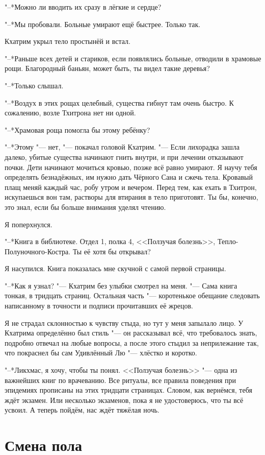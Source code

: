 \documentclass[a4paper,10pt]{book}
\begin{document}
"--*Можно ли вводить их сразу в лёгкие и сердце?

"--*Мы пробовали. Больные умирают ещё быстрее. Только так.

Кхатрим укрыл тело простынёй и встал.

"--*Раньше всех детей и стариков, если появлялись больные, отводили в храмовые 
рощи. Благородный баньян, может быть, ты видел такие деревья?

"--*Только слышал.

"--*Воздух в этих рощах целебный, существа гибнут там очень быстро. К 
сожалению, 
возле Тхитрона нет ни одной. 

"--*Храмовая роща помогла бы этому ребёнку?

"--*Этому "--- нет, "--- покачал головой Кхатрим. "--- Если лихорадка зашла 
далеко, убитые существа начинают гнить внутри, и при лечении отказывают почки.
Дети начинают мочиться кровью, позже всё равно умирают. 
Я научу тебя определять безнадёжных, им нужно дать Чёрного Сана и сжечь тела. 
Кровавый плащ меняй каждый час, робу утром и вечером. Перед тем, как ехать в 
Тхитрон, искупаешься вон там, растворы для втирания в тело приготовят. Ты бы, 
конечно, это 
знал, если бы больше внимания уделял чтению.

Я поперхнулся.

"--*Книга в библиотеке. Отдел 1, полка 4, <<Ползучая болезнь>>, 
Тепло-Полуночного-Костра. Ты её хотя бы открывал?

Я насупился. Книга показалась мне скучной с самой первой страницы.

"--*Как я узнал? "--- Кхатрим без улыбки смотрел на меня. "--- Сама книга 
тонкая,
в тридцать страниц. Остальная часть "--- коротенькое обещание следовать 
написанному
в точности и подписи прочитавших её жрецов.

Я не страдал склонностью к чувству стыда, но тут у меня запылало лицо. У 
Кхатрима определённо
был стиль "--- он рассказывал всё, что требовалось знать, подробно отвечал на 
любые вопросы, 
а после этого стыдил за неприлежание так, 
что покраснел бы сам Удивлённый Лю "--- хлёстко и коротко.

"--*Ликхмас, я хочу, чтобы ты понял. <<Ползучая болезнь>> "--- одна из
важнейших книг по врачеванию. Все ритуалы, все правила поведения при
эпидемиях прописаны на этих тридцати страницах. Словом, как вернёмся,
тебя ждёт экзамен. Или несколько экзаменов, пока я не удостоверюсь,
что ты всё усвоил. А теперь пойдём, нас ждёт тяжёлая ночь.

\section{Смена пола}
\end{document}
